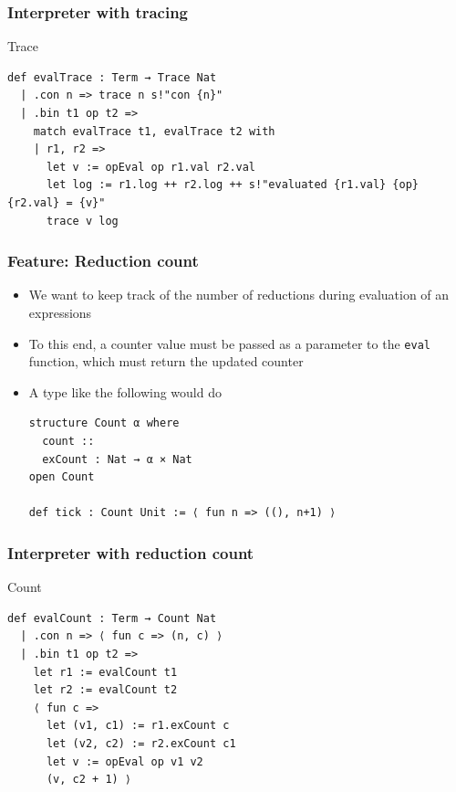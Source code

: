 \documentclass{beamer}
\begin{document}
\begin{frame}[fragile]
  \frametitle{Interpreter with tracing}
  \begin{block}{Trace}
\begin{lstlisting}
def evalTrace : Term → Trace Nat
  | .con n => trace n s!"con {n}"
  | .bin t1 op t2 =>
    match evalTrace t1, evalTrace t2 with
    | r1, r2 =>
      let v := opEval op r1.val r2.val
      let log := r1.log ++ r2.log ++ s!"evaluated {r1.val} {op} {r2.val} = {v}"
      trace v log
\end{lstlisting}  
\end{block}
\end{frame}

\begin{frame}[fragile]
  \frametitle{Feature: Reduction count}
  \begin{itemize}
  \item We want to keep track of the number of reductions during
    evaluation of an expressions
  \item To this end, a counter value must be passed as a parameter to
    the \lstinline{eval} function, which must return the updated
    counter
  \item A type like the following would do
\begin{lstlisting}
structure Count α where
  count ::
  exCount : Nat → α × Nat
open Count

def tick : Count Unit := ⟨ fun n => ((), n+1) ⟩
\end{lstlisting}
  \end{itemize}
\end{frame}

\begin{frame}[fragile]
  \frametitle{Interpreter with reduction count}\small
  \begin{block}{Count}
\begin{lstlisting}
def evalCount : Term → Count Nat
  | .con n => ⟨ fun c => (n, c) ⟩
  | .bin t1 op t2 =>
    let r1 := evalCount t1
    let r2 := evalCount t2
    ⟨ fun c =>
      let (v1, c1) := r1.exCount c
      let (v2, c2) := r2.exCount c1
      let v := opEval op v1 v2
      (v, c2 + 1) ⟩
\end{lstlisting} 
\end{block}
\end{frame}            
\end{document}
